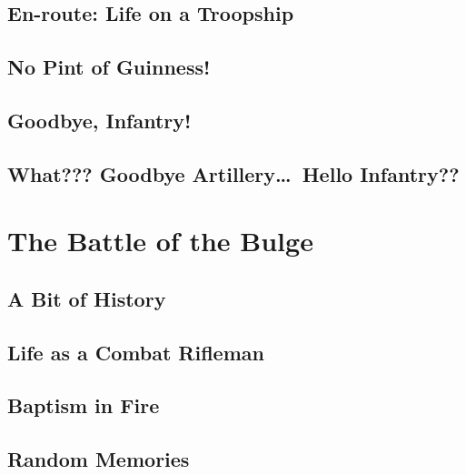 \chapter{En-route: Life on a Troopship}\label{en-route}


\chapter{No Pint of Guinness!}\label{no-pint-of-guinness}


\chapter{Goodbye, Infantry!}\label{goodbye-infantry}


\chapter{What??? Goodbye Artillery\ldots\ Hello Infantry??}\label{goodbye-artillery}


\part{The Battle of the Bulge}\label{battle-of-the-bulge}
\chapter{A Bit of History}\label{bit-of-history}


\chapter{Life as a Combat Rifleman}\label{life-as-a-combat-rifleman}


\chapter{Baptism in Fire}\label{baptism-in-fire}


\chapter{Random Memories}\label{random-memories}


